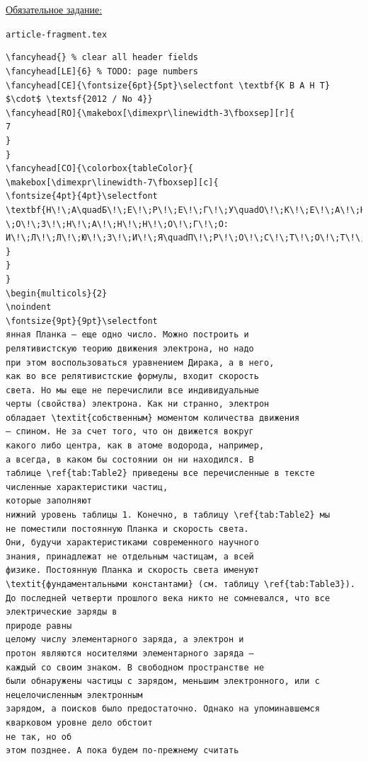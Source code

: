 \documentclass[a4paper,10pt]{article}
\begin{document}
\newpage
\section*{\fontsize{16pt}{16pt}\selectfont {}}
\underline{Обязательное задание:}

\vspace{5mm}
\noindent\verb|article-fragment.tex|
\fontsize{8pt}{8pt}\selectfont
\begin{verbatim}
\fancyhead{} % clear all header fields
\fancyhead[LE]{6} % TODO: page numbers
\fancyhead[CE]{\fontsize{6pt}{5pt}\selectfont \textbf{К В А Н Т} $\cdot$ \textsf{2012 / No 4}}
\fancyhead[RO]{\makebox[\dimexpr\linewidth-3\fboxsep][r]{
7
}
}
\fancyhead[CO]{\colorbox{tableColor}{
\makebox[\dimexpr\linewidth-7\fboxsep][c]{
\fontsize{4pt}{4pt}\selectfont
\textbf{Н\!\;А\quadБ\!\;Е\!\;Р\!\;Е\!\;Г\!\;У\quadО\!\;К\!\;Е\!\;А\!\;Н\!\;А\quadН\!\;Е\!\;П\!
\;О\!\;З\!\;Н\!\;А\!\;Н\!\;Н\!\;О\!\;Г\!\;О:
И\!\;Л\!\;Л\!\;Ю\!\;З\!\;И\!\;Я\quadП\!\;Р\!\;О\!\;С\!\;Т\!\;О\!\;Т\!\;Ы}
}
}
}
\begin{multicols}{2}
\noindent
\fontsize{9pt}{9pt}\selectfont
янная Планка – еще одно число. Можно построить и
релятивистскую теорию движения электрона, но надо
при этом воспользоваться уравнением Дирака, а в него,
как во все релятивистские формулы, входит скорость
света. Но мы еще не перечислили все индивидуальные
черты (свойства) электрона. Как ни странно, электрон
обладает \textit{собственным} моментом количества движения
– спином. Не за счет того, что он движется вокруг
какого либо центра, как в атоме водорода, например,
а всегда, в каком бы состоянии он ни находился. В
таблице \ref{tab:Table2} приведены все перечисленные в тексте численные характеристики частиц,
которые заполняют
нижний уровень таблицы 1. Конечно, в таблицу \ref{tab:Table2} мы
не поместили постоянную Планка и скорость света.
Они, будучи характеристиками современного научного
знания, принадлежат не отдельным частицам, а всей
физике. Постоянную Планка и скорость света именуют
\textit{фундаментальными константами} (см. таблицу \ref{tab:Table3}).
До последней четверти прошлого века никто не сомневался, что все электрические заряды в
природе равны
целому числу элементарного заряда, а электрон и
протон являются носителями элементарного заряда –
каждый со своим знаком. В свободном пространстве не
были обнаружены частицы с зарядом, меньшим электронного, или с нецелочисленным электронным
зарядом, а поисков было предостаточно. Однако на упоминавшемся кварковом уровне дело обстоит
не так, но об
этом позднее. А пока будем по-прежнему считать

\end{verbatim}
\end{document}
